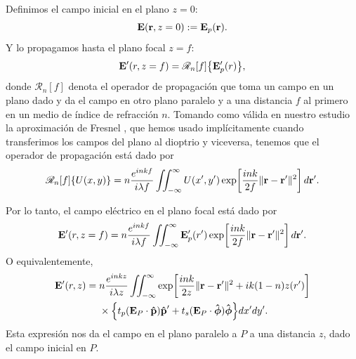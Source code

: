 Definimos el campo inicial en el plano $z=0$:
\begin{equation}
    \vb{E}(\vb r, z=0)
    :=
    \vb{E}_p(\vb r).
\end{equation}
Y lo propagamos hasta el plano focal $z=f$:
\begin{equation}
    \vb{E}'(r, z=f)
    =
    \mathscr{R}_n [f] \big\{ \vb{E}_p'(r) \big\},
\end{equation}
donde $\mathscr R_n[f]$ denota el operador de propagación que toma un campo en un plano dado y da el campo en otro plano paralelo y a una distancia $f$ al primero en un medio de índice de refracción $n$. Tomando como válida en nuestro estudio la aproximación de Fresnel \cite{goodman2005}, que hemos usado implícitamente cuando transferimos los campos del plano al dioptrio y viceversa, tenemos que el operador de propagación está dado por
\begin{equation}
    \mathscr{R}_n [f] \{ U(x,y) \}
    =
    n\frac{e^{inkf}}{i \lambda f}
    \iint_{-\infty}^{\infty}
    U(x',y')
    \exp\!\left[
        \frac{ink}{2f}
        \lVert \vb{r}-\vb{r}' \rVert^2
    \right]
    d\vb{r}'.
\end{equation}

Por lo tanto, el campo eléctrico en el plano focal está dado por
\begin{equation}
    \vb{E}'(r, z=f)
    =
    n\frac{e^{inkf}}{i \lambda f}
    \iint_{-\infty}^{\infty}
    \vb{E}_p'(r')
    \exp\!\left[
        \frac{ink}{2f}
        \lVert \vb{r}-\vb{r}' \rVert^2
    \right]
    d\vb{r}'.
\end{equation}
O equivalentemente,
\begin{equation}
\begin{aligned}
    \vb{E}'(r, z)
    ={}&
    n\frac{e^{inkz}}{i \lambda z}
    \iint_{-\infty}^{\infty}
    \exp\!\left[
        \frac{ink}{2z}
        \lVert \vb{r}-\vb{r}' \rVert^2
        +
        ik(1-n)z(r')
    \right]
    \\
    &\times
    \Big\{
        t_p (\vb{E}_P \cdot \bm{\hat{\mathbf{p}}}) \bm{\hat{\mathbf{p}}}'
        +
        t_s (\vb{E}_P \cdot \bm{\hat{\mathbf{\phi}}}) \bm{\hat{\mathbf{\phi}}}
    \Big\}
    dx'dy'.
\end{aligned}
\label{eq:E_field_at_z_3D}
\end{equation}
Esta expresión nos da el campo en el plano paralelo a $P$ a una distancia $z$, dado el campo inicial en $P$.

